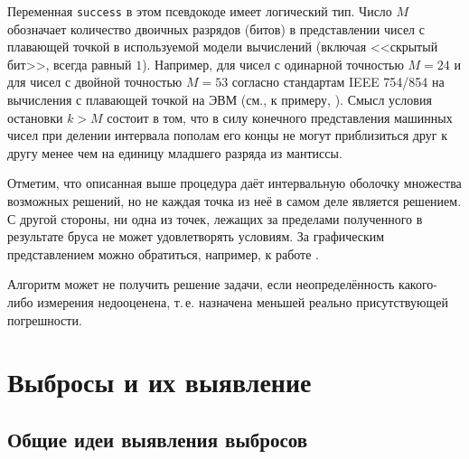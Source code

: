 \documentclass[a5paper,openany]{book}
\begin{document}
Переменная \texttt{success} в этом псевдокоде имеет логический тип. Число $M$ 
обозначает количество двоичных разрядов (битов) в представлении чисел с плавающей 
точкой в используемой модели вычислений (включая <<скрытый бит>>, всегда равный $1$). 
Например, для чисел с одинарной точностью $M = 24$ и для чисел с двойной точностью 
$M = 53$ согласно стандартам IEEE 754/854 на вычисления с плавающей точкой на ЭВМ 
(см., к примеру, \cite{Goldberg}). Смысл условия остановки $k > M$ состоит в том, 
что в силу конечного представления машинных чисел при делении интервала пополам 
его концы не могут приблизиться друг к другу менее чем на единицу младшего разряда 
из мантиссы.    
  
Отметим, что описанная выше процедура даёт интервальную оболочку множества возможных 
решений, но не каждая точка из неё в самом деле является решением. С другой стороны, 
ни одна из точек, лежащих за пределами полученного в результате бруса не может 
удовлетворять условиям. За графическим представлением можно обратиться, например, 
к работе \cite{Gutowski}. 
  
Алгоритм может не получить решение задачи, если неопределённость какого-либо 
измерения недооценена, т.\,е. назначена меньшей реально присутствующей погрешности. 
   
        
  
\section{Выбросы и их выявление} 
\label{RegrOutlSect} 
 
   
\subsection{Общие идеи выявления выбросов} 

  
\end{document}
